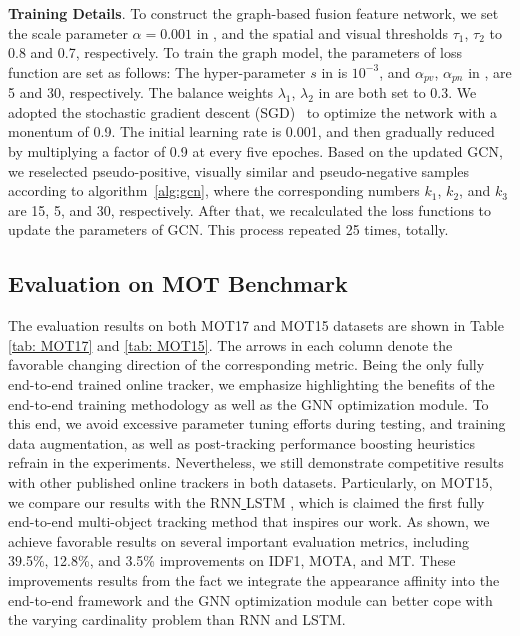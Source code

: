 \documentclass[10pt,twocolumn,letterpaper]{article}
\begin{document}
\textbf{Training Details}.
To construct the graph-based fusion feature network, we set the scale parameter $\alpha=0.001$ in ,
and the spatial and visual thresholds $\tau_1$, $\tau_2$ to 0.8 and 0.7, respectively.
To train the graph model, the parameters of loss function are set as follows: 
The hyper-parameter $s$ in  is $10^{-3}$, 
and $\alpha_{pv}$, $\alpha_{pn}$ in ,  are 5 and 30, respectively.
The balance weights $\lambda_1$, $\lambda_2$ in  are both set to 0.3.
We adopted the stochastic gradient descent (SGD)~\cite{sutskever2013importance} to optimize the network with a monentum of 0.9.
The initial learning rate is 0.001, and then gradually reduced by multiplying a factor of 0.9 at every five epoches.
Based on the updated GCN, we reselected pseudo-positive, visually similar and pseudo-negative samples according to algorithm~\ref{alg:gcn}, where the corresponding numbers $k_1$, $k_2$, and $k_3$ are 15, 5, and 30, respectively.
After that, we recalculated the loss functions to update the parameters of GCN.
This process repeated 25 times, totally.


\subsection{Evaluation on MOT Benchmark}
\label{sec: 52}
The evaluation results on both MOT17 and MOT15 datasets are shown in Table \ref{tab: MOT17} and \ref{tab: MOT15}. The arrows in each column denote the favorable changing direction of the corresponding metric. Being the only fully end-to-end trained online tracker, we emphasize highlighting the benefits of the end-to-end training methodology as well as the GNN optimization module. To this end, we avoid excessive parameter tuning efforts during testing, and training data augmentation, as well as post-tracking performance boosting heuristics refrain in the experiments. Nevertheless, we still demonstrate competitive results with other published online trackers in both datasets. Particularly, on MOT15, we compare our results with the RNN\underline{ }LSTM \cite{Milan2017AAAI}, which is claimed the first fully end-to-end multi-object tracking method that inspires our work. As shown, we achieve favorable results on several important evaluation metrics, including 39.5\%, 12.8\%, and 3.5\% improvements on IDF1, MOTA, and MT. These improvements results from the fact we integrate the appearance affinity into the end-to-end framework and the GNN optimization module can better cope with the varying cardinality problem than RNN and LSTM.
\end{document}
